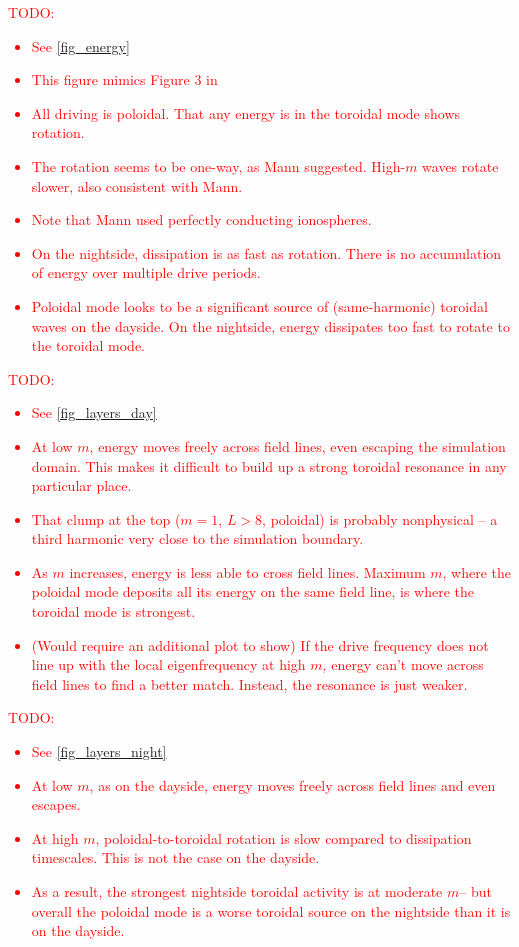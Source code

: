 \documentclass{article}
\newcommand{\todo}[1]{ \textcolor{red}{TODO: #1} }
\newcommand{\azm}{\ensuremath{m}\xspace}
\begin{document}
\todo{
\begin{itemize}
    \item See \cref{fig_energy}
    \item This figure mimics Figure 3 in \cite{mann_1995}
    \item All driving is poloidal. That any energy is in the toroidal mode shows rotation.
    \item The rotation seems to be one-way, as Mann suggested. High-\azm waves rotate slower, also consistent with Mann.
    \item Note that Mann used perfectly conducting ionospheres.
    \item On the nightside, dissipation is as fast as rotation. There is no accumulation of energy over multiple drive periods.
    \item Poloidal mode looks to be a significant source of (same-harmonic) toroidal waves on the dayside. On the nightside, energy dissipates too fast to rotate to the toroidal mode.
\end{itemize}
}

\todo{
\begin{itemize}
    \item See \cref{fig_layers_day}
    \item At low \azm, energy moves freely across field lines, even escaping the simulation domain. This makes it difficult to build up a strong toroidal resonance in any particular place.
    \item That clump at the top ($\azm = 1$, $L > 8$, poloidal) is probably nonphysical -- a third harmonic very close to the simulation boundary.
    \item As \azm increases, energy is less able to cross field lines. Maximum \azm, where the poloidal mode deposits all its energy on the same field line, is where the toroidal mode is strongest.
    \item (Would require an additional plot to show) If the drive frequency does not line up with the local eigenfrequency at high \azm, energy can't move across field lines to find a better match. Instead, the resonance is just weaker.
\end{itemize}
}

\todo{
\begin{itemize}
    \item See \cref{fig_layers_night}
    \item At low \azm, as on the dayside, energy moves freely across field lines and even escapes.
    \item At high \azm, poloidal-to-toroidal rotation is slow compared to dissipation timescales. This is not the case on the dayside.
    \item As a result, the strongest nightside toroidal activity is at moderate \azm -- but overall the poloidal mode is a worse toroidal source on the nightside than it is on the dayside.
\end{itemize}
}
\end{document}
